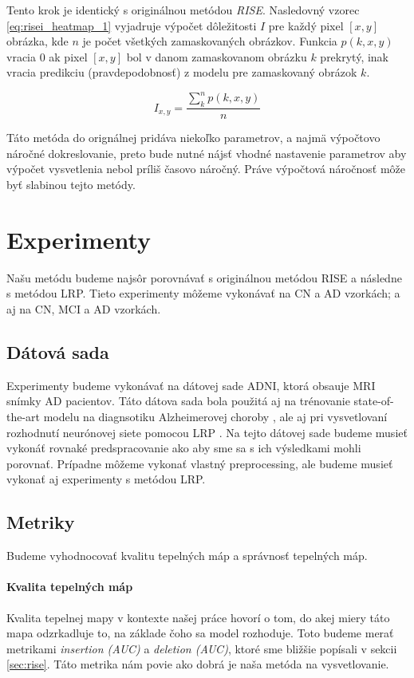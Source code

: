 Tento krok je identický s originálnou metódou \textit{RISE}. Nasledovný vzorec \ref{eq:risei_heatmap_1} vyjadruje výpočet dôležitosti $I$ pre každý pixel $[x, y]$ obrázka, kde $n$ je počet všetkých zamaskovaných obrázkov. Funkcia $p(k, x, y)$ vracia $0$ ak pixel $[x, y]$ bol v danom zamaskovanom obrázku $k$ prekrytý, inak vracia predikciu (pravdepodobnosť) z modelu pre zamaskovaný obrázok $k$.

\begin{equation}
    I_{x, y} = \frac{\sum_{k}^{n} p(k, x, y)}{n}
    \label{eq:risei_heatmap_1}
\end{equation}

Táto metóda do orignálnej pridáva niekoľko parametrov, a najmä výpočtovo náročné dokreslovanie, preto bude nutné nájsť vhodné nastavenie parametrov aby výpočet vysvetlenia nebol príliš časovo náročný. Práve výpočtová náročnosť môže byť slabinou tejto metódy.

\section{Experimenty}

Našu metódu budeme najsôr porovnávať s originálnou metódou RISE a následne s metódou LRP. Tieto experimenty môžeme vykonávať na CN a AD vzorkách; a aj na CN, MCI a AD vzorkách.

\subsection{Dátová sada} Experimenty budeme vykonávať na dátovej sade ADNI, ktorá obsauje MRI snímky AD pacientov. Táto dátova sada bola použitá aj na trénovanie state-of-the-art modelu na diagnsotiku Alzheimerovej choroby \cite{esmaeilzadeh2018end}, ale aj pri vysvetlovaní rozhodnutí neurónovej siete pomocou LRP \cite{bohle2019layer}. Na tejto dátovej sade budeme musieť vykonáť rovnaké predspracovanie ako \citeauthor*{bohle2019layer} aby sme sa s ich výsledkami mohli porovnať. Prípadne môžeme vykonať vlastný preprocessing, ale budeme musieť vykonať aj experimenty s metódou LRP.

\subsection{Metriky}

Budeme vyhodnocovať kvalitu tepelných máp a správnosť tepelných máp. 

\paragraph{Kvalita tepelných máp} Kvalita tepelnej mapy v kontexte našej práce hovorí o tom, do akej miery táto mapa odzrkadluje to, na základe čoho sa model rozhoduje. Toto budeme merať metrikami \textit{insertion (AUC)} a \textit{deletion (AUC)}, ktoré sme bližšie popísali v sekcii \ref{sec:rise}. Táto metrika nám povie ako dobrá je naša metóda na vysvetlovanie.

